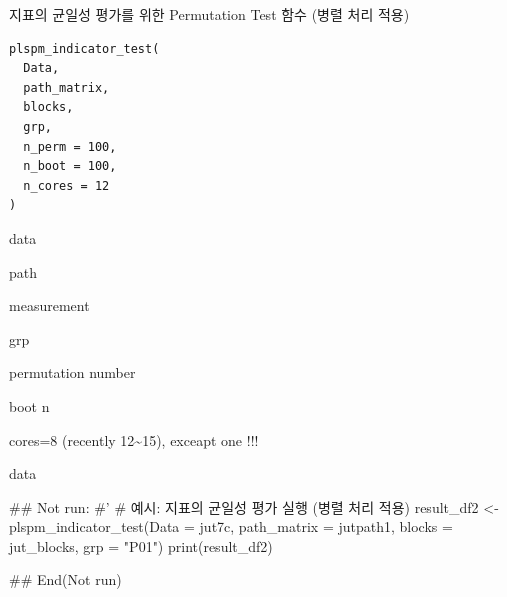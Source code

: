 \documentclass[a4paper]{book}
\begin{document}
%
\begin{Description}
지표의 균일성 평가를 위한 Permutation Test 함수 (병렬 처리 적용)
\end{Description}
%
\begin{Usage}
\begin{verbatim}
plspm_indicator_test(
  Data,
  path_matrix,
  blocks,
  grp,
  n_perm = 100,
  n_boot = 100,
  n_cores = 12
)
\end{verbatim}
\end{Usage}
%
\begin{Arguments}
\begin{ldescription}
\item[\code{Data}] data

\item[\code{path\_matrix}] path

\item[\code{blocks}] measurement

\item[\code{grp}] grp

\item[\code{n\_perm}] permutation number

\item[\code{n\_boot}] boot n

\item[\code{n\_cores}] cores=8 (recently 12\textasciitilde{}15), exceapt one !!!
\end{ldescription}
\end{Arguments}
%
\begin{Value}
data
\end{Value}
%
\begin{Examples}
\begin{ExampleCode}

\#\# Not run: 
#'
# 예시: 지표의 균일성 평가 실행 (병렬 처리 적용)
result_df2 <- plspm_indicator_test(Data = jut7c, path_matrix = jutpath1, blocks = jut_blocks, grp = "P01")
print(result_df2)

## End(Not run)

\end{ExampleCode}
\end{Examples}
\end{document}
